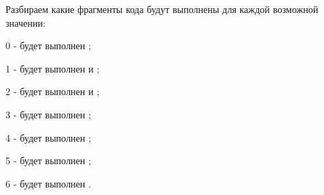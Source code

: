 Разбираем какие фрагменты кода будут выполнены для каждой возможной значении:
\begin{icItems}
	\item 0 - будет выполнен ;
	\item 1 - будет выполнен  и ;
	\item 2 - будет выполнен  и ;
	\item 3 - будет выполнен ;
	\item 4 - будет выполнен ;
	\item 5 - будет выполнен ;
	\item 6 - будет выполнен .
\end{icItems}

